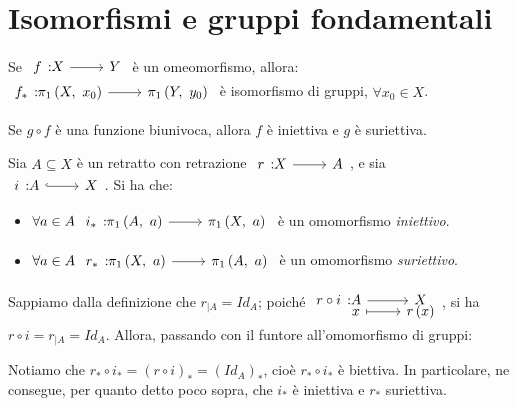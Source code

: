 \section{Isomorfismi e gruppi fondamentali}
\begin{corollary}
	Se $\funz{f}{X}{Y}$ è un omeomorfismo, allora:\\ $\funz{f_{\ast}}{\gruf{X}{x_0}}{\gruf{Y}{y_0}}$ è isomorfismo di gruppi, $\forall x_0\in X$.
\end{corollary}
\begin{remember}
	Se $g\circ f$ è una funzione biunivoca, allora $f$ è iniettiva e $g$ è suriettiva.
\end{remember}
\begin{corollary}
	Sia $A\subseteq X$ è un retratto con retrazione $\funz{r}{X}{A}$, e sia \\ $\incl{i}{A}{X}$. Si ha che:
	\begin{itemize}
		\item $\forall a\in A\ \funz{i_{\ast}}{\gruf{A}{a}}{\gruf{X}{a}}$ è un omomorfismo \textit{iniettivo}.
		\item $\forall a\in A\ \funz{r_{\ast}}{\gruf{X}{a}}{\gruf{A}{a}}$ è un omomorfismo \textit{suriettivo}.
	\end{itemize}
\end{corollary}
\begin{demonstration}
	Sappiamo dalla definizione che $r_{\mid A}=Id_A$; poiché $\funztot{r\circ i}{A}{X}{x}{r\left(x\right)}$, si ha $r\circ i=r_{\mid A}=Id_A$. Allora, passando con il funtore all'omomorfismo di gruppi:
	\begin{center}
	\end{center}
Notiamo che $r_{\ast}\circ i_{\ast}=\left(r\circ i\right)_{\ast}=\left(Id_A\right)_{\ast}$, cioè $r_{\ast}\circ i_{\ast}$ è biettiva. In particolare, ne consegue, per quanto detto poco sopra, che $i_{\ast}$ è iniettiva e $r_{\ast}$ suriettiva.
\end{demonstration}
